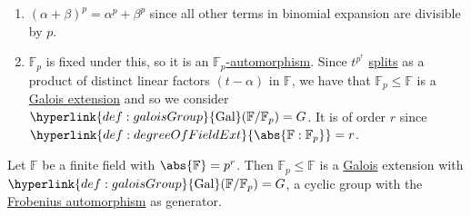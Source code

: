\documentclass{article}
\DeclareMathOperator{\Gal}{Gal}
\newcommand{\F}{\mathbb{F}}
\begin{document}

\begin{remark}\leavevmode
    \begin{enumerate}[label=(\roman*)]
        \item $(\alpha+\beta)^p = \alpha^p + \beta^p$ since all other terms in binomial expansion are divisible by $p$.
        \item $\F_p$ is fixed under this, so it is an \hyperlink{def:homo}{$\F_p$-automorphism}.
    Since $t^{p^r}$ \hyperlink{def:splitting}{splits} as a product of distinct linear factors $(t-\alpha)$ in $\F$, we have that $\F_p \leq \F$ is a \hyperlink{def:galoisExt}{Galois extension} and so we consider $\hyperlink{def:galoisGroup}{\Gal}(\F/\F_p) = G$.
    It is of order $r$ since $\hyperlink{def:degreeOfFieldExt}{\abs{\F:\F_p}}=r$.
    \end{enumerate}
\end{remark}

\begin{nthm}\label{thm:3.16}
    Let $\F$ be a finite field with $\abs{\F} = p^r$.
    Then $\F_p \leq \F$ is a \hyperlink{def:galoisExt}{Galois} extension with $\hyperlink{def:galoisGroup}{\Gal}(\F/\F_p) = G$, a cyclic group with the \hyperlink{def:frob}{Frobenius automorphism} as generator.
\end{nthm}
\end{document}
